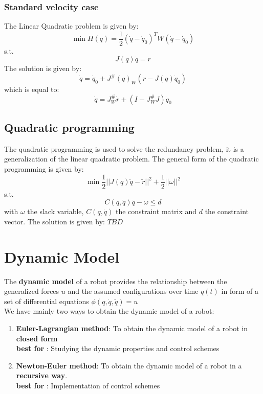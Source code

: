 \documentclass[a4paper,12pt]{article}
\begin{document}
\subsubsection{Standard velocity case}
The Linear Quadratic problem is given by:
\begin{equation}
    \min{H(q)} = \frac{1}{2} (\dot{q}-\dot{q}_0)^T W (\dot{q}-\dot{q}_0)
\end{equation} s.t. \begin{equation}
    J(q) \dot{q} = \dot{r}
\end{equation}
The solution is given by:
\begin{equation}
    \dot{q} = \dot{q}_0 + J^{\#}(q)_W (\dot{r}-J(q)\dot{q}_0)
\end{equation}
which is equal to:
\begin{equation}
    \dot{q} = J^{\#}_W\dot{r}+(I - J^{\#}_WJ)\dot{q}_0
\end{equation}
\subsection{Quadratic programming}
The quadratic programming is used to solve the redundancy problem,
it is a generalization of the linear quadratic problem.
The general form of the quadratic programming is given by:
\begin{equation}
    \min \frac{1}{2}||J(q)\ddot{q}-\ddot{r}||^2 + \frac{1}{2}||\omega||^2
\end{equation} s.t. \begin{equation}
    C(q,\dot{q})\dot{q} - \omega \leq d
\end{equation}
with $\omega$ the slack variable, $C(q,\dot{q})$ the constraint 
matrix and $d$ the constraint vector.\newline
The solution is given by: $TBD$





\section{Dynamic Model}
The \textbf{dynamic model} of a robot provides 
the relationship between the generalized forces $u$ and the
assumed configurations over time $q(t)$ in form of 
a set of differential equations $\phi(q,\dot{q},\ddot{q})=u$\\
We have mainly two ways to obtain the dynamic model of a robot:
\begin{enumerate}
    \item \textbf{Euler-Lagrangian method}: To 
    obtain the dynamic model of a robot in \textbf{closed form} \\
     \textbf{best for }: Studying the dynamic properties and control schemes
    \item \textbf{Newton-Euler method}: To obtain the dynamic model of a robot in 
     a \textbf{recursive way}.\\
     \textbf{best for }: Implementation of control schemes
\end{enumerate}
\end{document}

